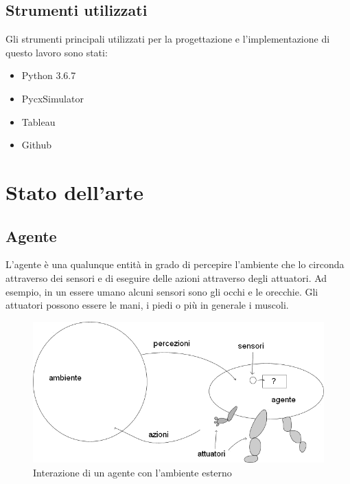 \documentclass[12pt]{article}
\begin{document}
\subsection{Strumenti utilizzati}
Gli strumenti principali utilizzati per la progettazione e l'implementazione di questo lavoro sono stati:
\begin{itemize}
\item Python 3.6.7 \cite{Python}
\item PycxSimulator \cite{PycxSimulator}
\item Tableau \cite{Tableau} 
\item Github \cite{GitHub}
\end{itemize}

\newpage
\section{Stato dell'arte}

\subsection{Agente}

L'agente è una qualunque entità in grado di percepire l'ambiente che lo circonda attraverso dei sensori e di eseguire delle azioni attraverso degli attuatori. Ad esempio, in un essere umano alcuni sensori sono gli occhi e le orecchie. Gli attuatori possono essere le mani, i piedi o più in generale i muscoli.\\

\begin{figure}[ht]
\includegraphics[width=\textwidth,height=\textheight,keepaspectratio]{Figures/Vario/Agente.png}
\caption[Interazione di un agente con l'ambiente esterno]{Interazione di un agente con l'ambiente esterno}
\label{fig:Agente}
\end{figure}
\end{document}

